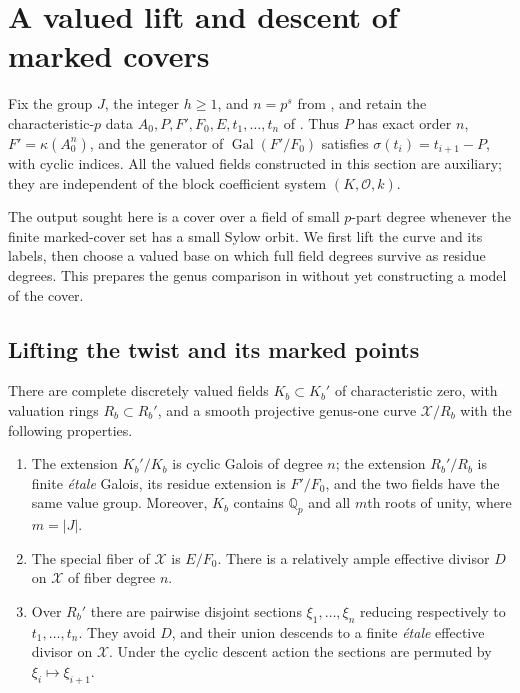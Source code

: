 \section{A valued lift and descent of marked covers}\label{sec:valuations}

Fix the group $J$, the integer $h\geq 1$, and $n=p^s$ from
, and retain the characteristic-$p$ data
$A_0,P,F',F_0,E,t_1,\ldots,t_n$ of .
Thus $P$ has exact order $n$, $F'=\kappa(A_0^n)$, and the generator
of $\operatorname{Gal}(F'/F_0)$ satisfies
$\sigma(t_i)=t_{i+1}-P$, with cyclic indices.  All the valued fields
constructed in this section are auxiliary; they are independent of the
block coefficient system $(K,\mathcal O,k)$.

The output sought here is a cover over a field of small $p$-part degree
whenever the finite marked-cover set has a small Sylow orbit. We first
lift the curve and its labels, then choose a valued base on which full
field degrees survive as residue degrees. This prepares the genus
comparison in  without yet constructing a
model of the cover.

\subsection{Lifting the twist and its marked points}

\begin{proposition}\label{prop:mixed-lift}
There are complete discretely valued fields $K_b\subset K_b'$ of
characteristic zero, with valuation rings $R_b\subset R_b'$, and a smooth
projective genus-one curve $\mathcal X/R_b$ with the following properties.
\begin{enumerate}[label=\textup{(\roman*)}]
\item The extension $K_b'/K_b$ is cyclic Galois of degree $n$;
the extension $R_b'/R_b$ is finite \emph{\'{e}tale} Galois, its residue
extension is $F'/F_0$, and the two fields have the same value group.
Moreover, $K_b$ contains $\mathbb Q_p$ and all $m$th roots of unity,
where $m=|J|$.
\item The special fiber of $\mathcal X$ is $E/F_0$.
There is a relatively ample effective divisor $D$ on $\mathcal X$ of
fiber degree $n$.
\item Over $R_b'$ there are pairwise disjoint sections
$\xi_1,\ldots,\xi_n$ reducing respectively to $t_1,\ldots,t_n$.
They avoid $D$, and their union descends to a finite \emph{\'{e}tale}
effective divisor on $\mathcal X$.
Under the cyclic descent action the sections are permuted by
$\xi_i\mapsto\xi_{i+1}$.
\end{enumerate}
\end{proposition}

